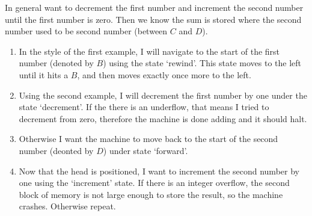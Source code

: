 \documentclass[11pt, letterpaper, twoside, openright]{book}
\begin{document}

In general want to decrement the first number and increment the second number until the first number is zero. Then we know the sum is stored where the second number used to be second number (between $C$ and $D$).

\begin{enumerate}
\item In the style of the first example, I will navigate to the start of the first number (denoted by $B$) using the state `rewind'. This state moves to the left until it hits a $B$, and then moves exactly once more to the left.

\item Using the second example, I will decrement the first number by one under the state `decrement'. If the there is an underflow, that means I tried to decrement from zero, therefore the machine is done adding and it should halt.

\item Otherwise I want the machine to move back to the start of the second number (deonted by $D$) under state `forward'.

\item Now that the head is positioned, I want to increment the second number by one using the `increment' state. If there is an integer overflow, the second block of memory is not large enough to store the result, so the machine crashes. Otherwise repeat.
\end{enumerate}
\end{document}
